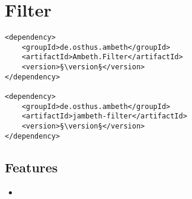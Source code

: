 \section{Filter}
\label{module:Filter}
\ClearAPI
\TODO
\begin{lstlisting}[style=POM,caption={Maven modules to use \emph{Ambeth Filter}}]
<dependency>
	<groupId>de.osthus.ambeth</groupId>
	<artifactId>Ambeth.Filter</artifactId>
	<version>§\version§</version>
</dependency>

<dependency>
	<groupId>de.osthus.ambeth</groupId>
	<artifactId>jambeth-filter</artifactId>
	<version>§\version§</version>
</dependency>
\end{lstlisting}
\subsection{Features}
\begin{itemize}
	\item \TODO
\end{itemize}


